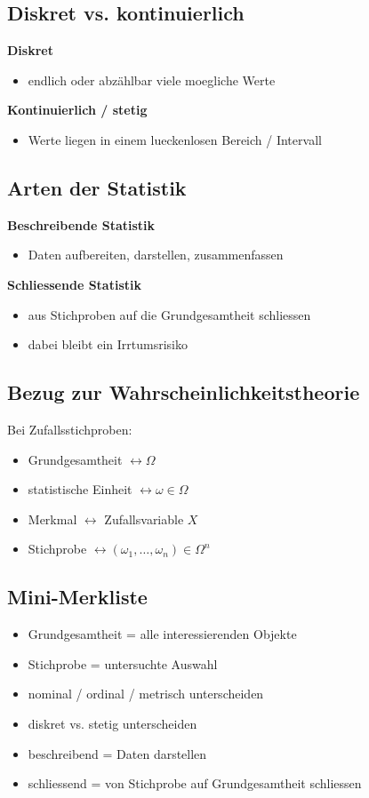 \documentclass[a4paper,11pt]{article}
\begin{document}
\subsection{Diskret vs. kontinuierlich}
\textbf{Diskret}
\begin{itemize}
  \item endlich oder abz\"ahlbar viele moegliche Werte
\end{itemize}

\textbf{Kontinuierlich / stetig}
\begin{itemize}
  \item Werte liegen in einem lueckenlosen Bereich / Intervall
\end{itemize}

\subsection{Arten der Statistik}
\textbf{Beschreibende Statistik}
\begin{itemize}
  \item Daten aufbereiten, darstellen, zusammenfassen
\end{itemize}

\textbf{Schliessende Statistik}
\begin{itemize}
  \item aus Stichproben auf die Grundgesamtheit schliessen
  \item dabei bleibt ein Irrtumsrisiko
\end{itemize}

\subsection{Bezug zur Wahrscheinlichkeitstheorie}
Bei Zufallsstichproben:
\begin{itemize}
  \item Grundgesamtheit $\leftrightarrow \Omega$
  \item statistische Einheit $\leftrightarrow \omega\in\Omega$
  \item Merkmal $\leftrightarrow$ Zufallsvariable $X$
  \item Stichprobe $\leftrightarrow (\omega_1,\dots,\omega_n)\in \Omega^n$
\end{itemize}

\subsection{Mini-Merkliste}
\begin{itemize}
  \item Grundgesamtheit = alle interessierenden Objekte
  \item Stichprobe = untersuchte Auswahl
  \item nominal / ordinal / metrisch unterscheiden
  \item diskret vs. stetig unterscheiden
  \item beschreibend = Daten darstellen
  \item schliessend = von Stichprobe auf Grundgesamtheit schliessen
\end{itemize}
\end{document}
